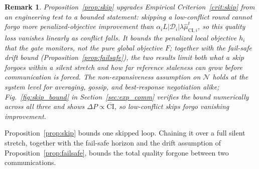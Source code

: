 \documentclass[conference]{IEEEtran}
\newtheorem{remark}{Remark}
\begin{document}
\begin{remark}
Proposition~\ref{prop:skip} upgrades Empirical Criterion~\ref{crit:skip} from an engineering test to a bounded statement: skipping a low-conflict round cannot forgo more penalized-objective improvement than $\alpha_i L|\mathcal{D}_i|\lambda\hat{\mu}_{\mathrm{CI},i}^t$, so this quality loss vanishes linearly as conflict falls. It bounds the penalized local objective $h_i$ that the gate monitors, not the pure global objective $F$; together with the fail-safe drift bound (Proposition~\ref{prop:failsafe}), the two results limit both what a skip forgoes within a silent stretch and how far reference staleness can grow before communication is forced. The non-expansiveness assumption on $\mathcal{N}$ holds at the system level for averaging, gossip, and best-response negotiation alike; Fig.~\ref{fig:skip_bound} in Section~\ref{sec:exp_comm} verifies the bound numerically across all three and shows $\Delta P\propto\overline{\mathrm{CI}}$, so low-conflict skips forgo vanishing improvement.
\end{remark}

Proposition~\ref{prop:skip} bounds one skipped loop. Chaining it over a full silent stretch, together with the fail-safe horizon and the drift assumption of Proposition~\ref{prop:failsafe}, bounds the total quality forgone between two communications.
\end{document}
